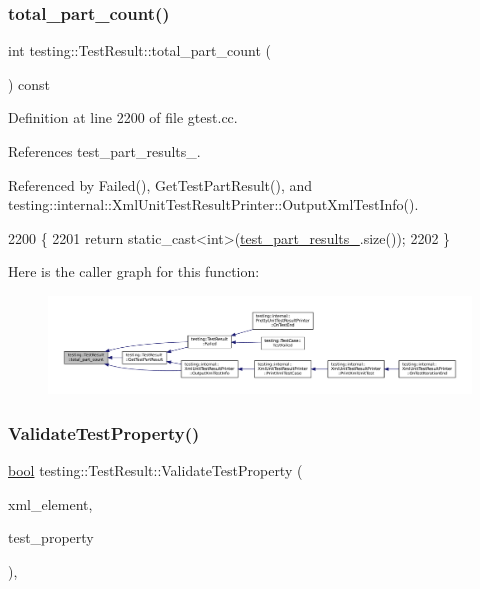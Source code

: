 \subsubsection{\texorpdfstring{total\+\_\+part\+\_\+count()}{total\_part\_count()}}
{\footnotesize\ttfamily int testing\+::\+Test\+Result\+::total\+\_\+part\+\_\+count (\begin{DoxyParamCaption}{ }\end{DoxyParamCaption}) const}



Definition at line 2200 of file gtest.\+cc.



References test\+\_\+part\+\_\+results\+\_\+.



Referenced by Failed(), Get\+Test\+Part\+Result(), and testing\+::internal\+::\+Xml\+Unit\+Test\+Result\+Printer\+::\+Output\+Xml\+Test\+Info().


\begin{DoxyCode}
2200                                        \{
2201   \textcolor{keywordflow}{return} \textcolor{keyword}{static\_cast<}\textcolor{keywordtype}{int}\textcolor{keyword}{>}(\hyperlink{classtesting_1_1TestResult_af17c00fae1435d344b318eb6bbb56cff}{test\_part\_results\_}.size());
2202 \}
\end{DoxyCode}
Here is the caller graph for this function\+:
\nopagebreak
\begin{figure}[H]
\begin{center}
\leavevmode
\includegraphics[width=350pt]{classtesting_1_1TestResult_a6174aa4019dcda7c34d776b5741c9032_icgraph}
\end{center}
\end{figure}
\mbox{\label{classtesting_1_1TestResult_a818c06cd2bfc00d6c81b0cebca044cb1}} 
\subsubsection{\texorpdfstring{Validate\+Test\+Property()}{ValidateTestProperty()}}
{\footnotesize\ttfamily \hyperlink{classbool}{bool} testing\+::\+Test\+Result\+::\+Validate\+Test\+Property (\begin{DoxyParamCaption}\item[{const std\+::string \&}]{xml\+\_\+element,  }\item[{const \hyperlink{classtesting_1_1TestProperty}{Test\+Property} \&}]{test\+\_\+property }\end{DoxyParamCaption})\hspace{0.3cm}{\ttfamily [static]}, {\ttfamily [private]}}



